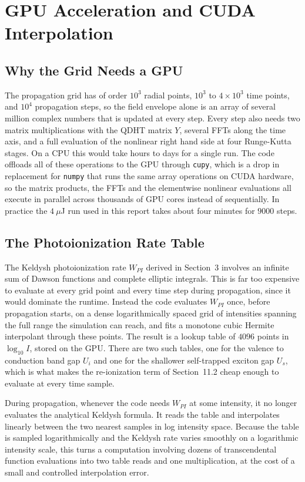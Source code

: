 \section{GPU Acceleration and CUDA Interpolation}

\subsection{Why the Grid Needs a GPU}

The propagation grid has of order $10^3$ radial points, $10^3$ to $4\times10^3$ time points, and $10^4$ propagation steps, so the field envelope alone is an array of several million complex numbers that is updated at every step. Every step also needs two matrix multiplications with the QDHT matrix $Y$, several FFTs along the time axis, and a full evaluation of the nonlinear right hand side at four Runge-Kutta stages. On a CPU this would take hours to days for a single run. The code offloads all of these operations to the GPU through \texttt{cupy}, which is a drop in replacement for \texttt{numpy} that runs the same array operations on CUDA hardware, so the matrix products, the FFTs and the elementwise nonlinear evaluations all execute in parallel across thousands of GPU cores instead of sequentially. In practice the $4\ \mu$J run used in this report takes about four minutes for $9000$ steps.

\subsection{The Photoionization Rate Table}

The Keldysh photoionization rate $W_{PI}$ derived in Section~3 involves an infinite sum of Dawson functions and complete elliptic integrals. This is far too expensive to evaluate at every grid point and every time step during propagation, since it would dominate the runtime. Instead the code evaluates $W_{PI}$ once, before propagation starts, on a dense logarithmically spaced grid of intensities spanning the full range the simulation can reach, and fits a monotone cubic Hermite interpolant through these points. The result is a lookup table of $4096$ points in $\log_{10} I$, stored on the GPU. There are two such tables, one for the valence to conduction band gap $U_i$ and one for the shallower self-trapped exciton gap $U_s$, which is what makes the re-ionization term of Section~11.2 cheap enough to evaluate at every time sample.

During propagation, whenever the code needs $W_{PI}$ at some intensity, it no longer evaluates the analytical Keldysh formula. It reads the table and interpolates linearly between the two nearest samples in log intensity space. Because the table is sampled logarithmically and the Keldysh rate varies smoothly on a logarithmic intensity scale, this turns a computation involving dozens of transcendental function evaluations into two table reads and one multiplication, at the cost of a small and controlled interpolation error.

